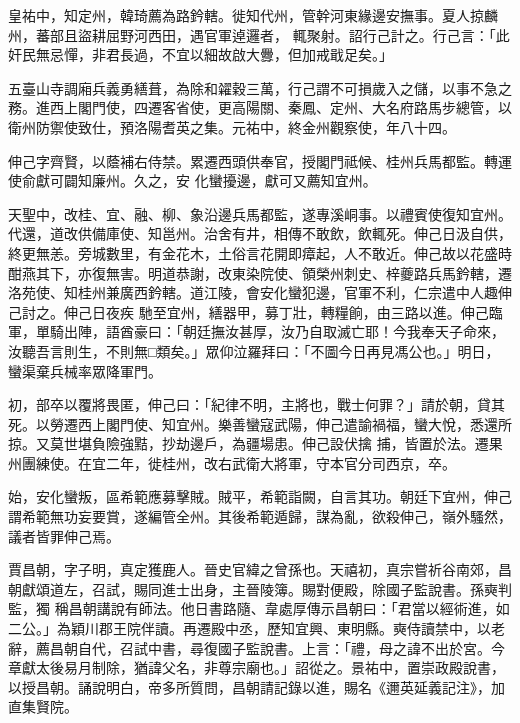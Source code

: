\begin{pinyinscope}
 皇祐中，知定州，韓琦薦為路鈐轄。徙知代州，管幹河東緣邊安撫事。夏人掠麟州，蕃部且盜耕屈野河西田，遇官軍逴邏者，
 輒聚射。詔行己計之。行己言：「此奸民無忌憚，非君長過，不宜以細故啟大釁，但加戒戢足矣。」



 五臺山寺調廂兵義勇繕葺，為除和糴穀三萬，行己謂不可損歲入之儲，以事不急之務。進西上閣門使，四遷客省使，更高陽關、秦鳳、定州、大名府路馬步總管，以衛州防禦使致仕，預洛陽耆英之集。元祐中，終金州觀察使，年八十四。



 伸己字齊賢，以蔭補右侍禁。累遷西頭供奉官，授閣門祗候、桂州兵馬都監。轉運使俞獻可闢知廉州。久之，安
 化蠻擾邊，獻可又薦知宜州。



 天聖中，改桂、宜、融、柳、象沿邊兵馬都監，遂專溪峒事。以禮賓使復知宜州。代還，道改供備庫使、知邕州。治舍有井，相傳不敢飲，飲輒死。伸己日汲自供，終更無恙。旁城數里，有金花木，土俗言花開即瘴起，人不敢近。伸己故以花盛時酣燕其下，亦復無害。明道恭謝，改東染院使、領榮州刺史、梓夔路兵馬鈐轄，遷洛苑使、知桂州兼廣西鈐轄。道江陵，會安化蠻犯邊，官軍不利，仁宗遣中人趣伸己討之。伸己日夜疾
 馳至宜州，繕器甲，募丁壯，轉糧餉，由三路以進。伸己臨軍，單騎出陣，語酋豪曰：「朝廷撫汝甚厚，汝乃自取滅亡耶！今我奉天子命來，汝聽吾言則生，不則無□類矣。」眾仰泣羅拜曰：「不圖今日再見馮公也。」明日，蠻渠棄兵械率眾降軍門。



 初，部卒以覆將畏匿，伸己曰：「紀律不明，主將也，戰士何罪？」請於朝，貸其死。以勞遷西上閣門使、知宜州。樂善蠻寇武陽，伸己遣諭禍福，蠻大悅，悉還所掠。又莫世堪負險強黠，抄劫邊戶，為疆場患。伸己設伏擒
 捕，皆置於法。遷果州團練使。在宜二年，徙桂州，改右武衛大將軍，守本官分司西京，卒。



 始，安化蠻叛，區希範應募擊賊。賊平，希範詣闕，自言其功。朝廷下宜州，伸己謂希範無功妄要賞，遂編管全州。其後希範遁歸，謀為亂，欲殺伸己，嶺外騷然，議者皆罪伸己焉。



 賈昌朝，字子明，真定獲鹿人。晉史官緯之曾孫也。天禧初，真宗嘗祈谷南郊，昌朝獻頌道左，召試，賜同進士出身，主晉陵簿。賜對便殿，除國子監說書。孫奭判監，獨
 稱昌朝講說有師法。他日書路隨、韋處厚傳示昌朝曰：「君當以經術進，如二公。」為穎川郡王院伴讀。再遷殿中丞，歷知宜興、東明縣。奭侍讀禁中，以老辭，薦昌朝自代，召試中書，尋復國子監說書。上言：「禮，母之諱不出於宮。今章獻太後易月制除，猶諱父名，非尊宗廟也。」詔從之。景祐中，置崇政殿說書，以授昌朝。誦說明白，帝多所質問，昌朝請記錄以進，賜名《邇英延義記注》，加直集賢院。




\end{pinyinscope}
